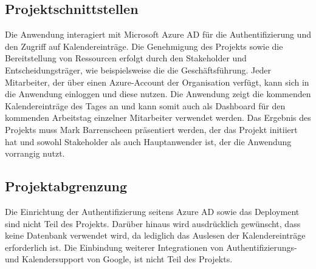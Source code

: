 \subsection{Projektschnittstellen} 
\label{sec:Projektschnittstellen}
Die Anwendung interagiert mit Microsoft Azure AD für die Authentifizierung und den Zugriff auf Kalendereinträge.
Die Genehmigung des Projekts sowie die Bereitstellung von Ressourcen erfolgt durch den Stakeholder und Entscheidungsträger, wie beispielsweise die die Geschäftsführung.
Jeder Mitarbeiter, der über einen Azure-Account der Organisation verfügt, kann sich in die Anwendung einloggen und diese nutzen.
Die Anwendung zeigt die kommenden Kalendereinträge des Tages an und kann somit auch als Dashboard für den kommenden Arbeitstag einzelner Mitarbeiter verwendet werden.
Das Ergebnis des Projekts muss Mark Barrenscheen präsentiert werden, der das Projekt initiiert hat und sowohl Stakeholder als auch Hauptanwender ist, der die Anwendung vorrangig nutzt.

\subsection{Projektabgrenzung} 
\label{sec:Projektabgrenzung}
Die Einrichtung der Authentifizierung seitens Azure AD sowie das Deployment sind nicht Teil des Projekts.
Darüber hinaus wird ausdrücklich gewünscht, dass keine Datenbank verwendet wird, da lediglich das Auslesen der Kalendereinträge erforderlich ist.
Die Einbindung weiterer Integrationen von Authentifizierungs- und Kalendersupport von \zB Google, ist nicht Teil des Projekts.